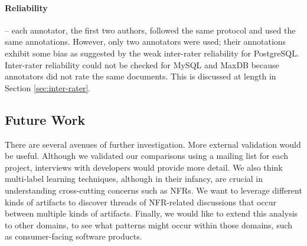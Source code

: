 \documentclass[smallextended]{svjour3}       %
\begin{document}
\paragraph{Reliability} -- each annotator, the first two authors, followed the same protocol and used the same annotations. 
However, only two annotators were used; their annotations exhibit some
bias as suggested by the weak inter-rater reliability for
PostgreSQL. Inter-rater reliability could not be checked for MySQL and
MaxDB because annotators did not rate the same documents. This is discussed at length in Section \ref{sec:inter-rater}.

\subsection{Future Work}
There are several avenues of further investigation.  
More external validation would be useful. 
Although we validated our comparisons using a mailing list for each project, interviews with developers would provide more detail. 
We also think multi-label learning techniques, although in their infancy, are crucial in understanding cross-cutting concerns such as NFRs. 
We want to leverage different kinds of artifacts to discover threads of NFR-related discussions that occur between multiple kinds of artifacts.
Finally, we would like to extend this analysis to other domains, to
see what patterns might occur within those domains, such as consumer-facing software products.
\end{document}
